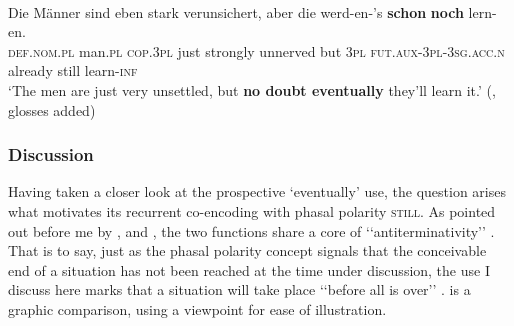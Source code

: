 \begin{exe}
	\ex {}\label{exProspectiveGerman1}\\
	\gll Die Männer sind eben stark verunsichert, aber die werd-en-'s \textbf{schon} \textbf{noch} lern-en.\\
	\textsc{def}.\textsc{nom}.\textsc{pl} man.\textsc{pl} \textsc{cop}.3\textsc{pl} just strongly unnerved but 3\textsc{pl} \textsc{fut}.\textsc{aux}-3\textsc{pl}-3\textsc{sg}.\textsc{acc}.\textsc{n} already still learn-\textsc{inf}\\
	\glt \lq The men are just very unsettled, but \textbf{no doubt eventually} they'll learn it.\rq{ }(\cite[122]{Thurmair1989}, glosses added)
\end{exe}

\subsubsection[tocentry={}]{Discussion} 
Having taken a closer look at the prospective \lq eventually\rq{ }use, the question arises what motivates its recurrent co-encoding with phasal polarity \textsc{still}. As pointed out before me by \textcite{Loebner1989}, \textcite[142–143]{Koenig1991} and \textcite{FrancezOd}, the two functions share a core of \lq\lq antiterminativity\rq\rq{ }\parencite{Vandeweghe1984}. That is to say, just as the phasal polarity concept signals that the conceivable end of a situation has not been reached at the time under discussion, the use I discuss here marks that a situation will take place \lq\lq before all is over\rq\rq{ }\parencite[s.v. \textit{yet}]{OED2022}.  is a graphic comparison, using a  viewpoint for ease of illustration.
 
